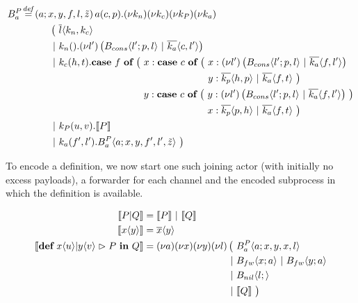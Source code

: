 \begin{align*}
  \adef*{B_a^P}{a}{x,y,f,l,\tilde{z}}{\arcv{a}{c,p} . \anew{k_n}{\anew{k_c}{\anew{k_P}{\anew{k_a}{
    \\
    &\hspace{1cm}
    \begin{aligned}[t]
      \big(\ &\asnd{l}{k_n,k_c}
      \\
      \apar  &\arcv{k_n}{} . \anew{l'}{\parens{\ains{B_{cons}}{l'}{p, l} \apar \asnd{k_a}{c, l'}}}
      \\
      \apar  &\arcv{k_c}{h,t} .
        \begin{aligned}[t]
          \acse*{f}{\ 
            &\aalt{x}{
              \begin{aligned}[t]
                \acse*{c}{\ 
                  &\aalt{x}{\anew*{l'}{
                    \ains{B_{cons}}{l'}{p,l} \apar \asnd{k_a}{f,l'}
                  }}\\
                  &\aalt{y}{
                    \asnd{k_p}{h,p} \apar \asnd{k_a}{f,t}
                  }
                \ }
              \end{aligned}
            }\\
            &\aalt{y}{
              \begin{aligned}[t]
                \acse*{c}{\ 
                  &\aalt{y}{\anew*{l'}{
                    \ains{B_{cons}}{l'}{p,l} \apar \asnd{k_a}{f,l'}
                  }}\\
                  &\aalt{x}{
                    \asnd{k_p}{p,h} \apar \asnd{k_a}{f,t}
                  }
                \ }
              \end{aligned}
            }
          \ }
        \end{aligned}
      \\
      \apar  &\arcv{k_P}{u,v} . \encMJtoAP{P}
      \\
      \apar  &\arcv{k_a}{f',l'} . \ains{B_a^P}{a}{x, y, f', l',\tilde{z}}
      \ \big)
    \end{aligned}
  }}}}} \\
\end{align*}

To encode a \joincalc definition,
we now start one such joining actor (with initially no excess payloads),
a forwarder for each channel
and the encoded subprocess in which the definition is available.

\begin{align*}
  \encMJtoAP{P \jpar Q}
  &= \encMJtoAP{P} \apar \encMJtoAP{Q}
  \\
  \encMJtoAP{\jsnd{x}{y}}
  &= \asnd{x}{y}
  \\
  \encMJtoAP{\jdef{\jrct{\jrcv{x}{u} \jpat \jrcv{y}{v}}{P}}{Q}}
  &= \anew{a}{\anew{x}{\anew{y}{\anew{l}{
    \begin{aligned}[t]
      \big(\ &\ains{B_a^P}{a}{x, y, x, l} \\
      \apar  &\ains{B_{fw}}{x}{a} \apar \ains{B_{fw}}{y}{a} \\
      \apar  &\ains{B_{nil}}{l}{} \\
      \apar  &\encMJtoAP{Q}
      \ \big)
    \end{aligned}
  }}}}
\end{align*}

